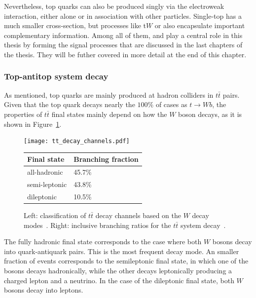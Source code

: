 Nevertheless, top quarks can also be produced singly via the electroweak interaction, either alone or in association with other particles. Single-top has a much smaller cross-section, but processes like t$W$ or \tH also encapsulate important complementary information.
Among all of them, \tH and \ttH play a central role in this thesis by forming the signal processes that are discussed in the last chapters of the thesis. They will be futher covered in more detail at the end of this chapter.

\subsubsection*{Top-antitop system decay}
\label{subsec:top_quark_decay}

As mentioned, top quarks are mainly produced at hadron colliders in $t\bar{t}$ pairs. Given that the top quark decays nearly the $100\%$ of cases as $t\rightarrow Wb$, the properties of $t\bar{t}$ final states mainly depend on how the $W$ boson decays, as it is shown in Figure~\ref{fig:diagram-and-table-top}.
\begin{figure}[htbp]
    \centering
    \begin{minipage}[c]{0.48\textwidth}
        \centering
        \texttt{[image: tt\_decay\_channels.pdf]}
    \end{minipage}
    \hfill
    \begin{minipage}[c]{0.48\textwidth}
        \centering
        \footnotesize
        \begin{tabular}{ll}
            \hline
            \textbf{Final state} & \textbf{Branching fraction} \\ \hline
            all-hadronic         & 45.7\%                     \\
            semi-leptonic        & 43.8\%                     \\
            dileptonic           & 10.5\%                     \\\hline
        \end{tabular}
    \end{minipage}
    \caption{Left: classification of $t\bar{t}$ decay channels based on the $W$ decay modes~\cite{Lannon_2012}. Right: inclusive branching ratios for the $t\bar{t}$ system decay~\cite{ParticleDataGroup}.}
    \label{fig:diagram-and-table-top}
\end{figure}
The fully hadronic final state corresponds to the case where both $W$ bosons decay into quark-antiquark pairs. This is the most frequent decay mode. An smaller fraction of events corresponds to the semileptonic final state, in which one of the bosons decays hadronically, while the other decays leptonically producing a charged lepton and a neutrino. In the case of the dileptonic final state, both $W$ bosons decay into leptons.
